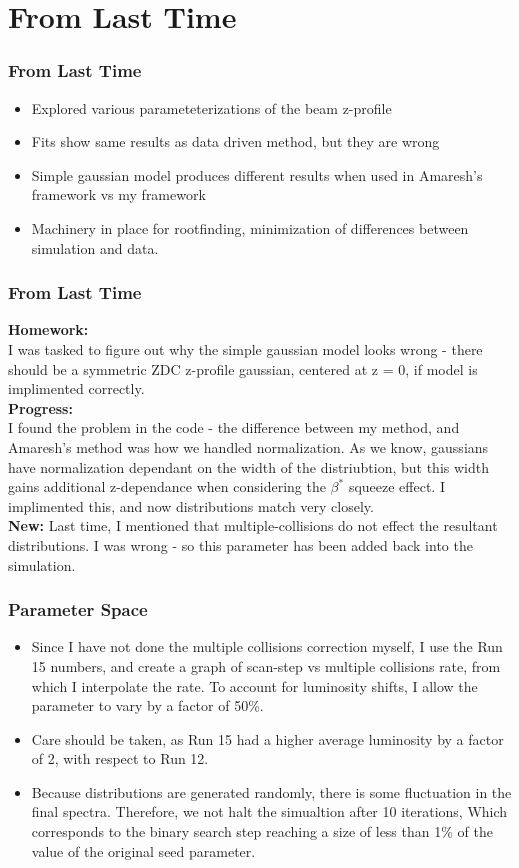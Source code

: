 \section{From Last Time}
\label{Section1_FromLastTime}

\begin{frame}
\frametitle{From Last Time}
\begin{itemize}
	\item Explored various parameteterizations of the beam z-profile
	\item Fits show same results as data driven method, but they are wrong
	\item Simple gaussian model produces different results when used in Amaresh's
		framework vs my framework
	\item Machinery in place for rootfinding, minimization of differences between
		simulation and data.
\end{itemize}
\end{frame}
\begin{frame}
\frametitle{From Last Time}

\textbf{Homework:} \\
I was tasked to figure out why the simple gaussian model looks wrong - there
should be a symmetric ZDC z-profile gaussian, centered at z = 0, if model is
implimented correctly.\\
\textbf{Progress:} \\
I found the problem in the code - the difference between my method, and
Amaresh's method was how we handled normalization. As we know, gaussians have
normalization dependant on the width of the distriubtion, but this width gains
additional z-dependance when considering the $\beta^*$ squeeze effect. I
implimented this, and now distributions match very closely.\\
\textbf{New:}
Last time, I mentioned that multiple-collisions do not effect the resultant
distributions. I was wrong - so this parameter has been added back into the
simulation.
\end{frame}

\begin{frame}
	\frametitle{Parameter Space}
	\begin{itemize}
		\item Since I have not done the multiple collisions correction myself, I
			use the Run 15 numbers, and create a graph of scan-step vs multiple
			collisions rate, from which I interpolate the rate. To account for
			luminosity shifts, I allow the parameter to vary by a factor of 50\%.
		\item Care should be taken, as Run 15 had a higher average luminosity by a
			factor of 2, with respect to Run 12.
		\item Because distributions are generated randomly, there is some
			fluctuation in the final spectra. Therefore, we not halt the simualtion
			after 10 iterations, Which corresponds to the binary search step reaching
			a size of less than 1\% of the value of the original seed parameter.
	\end{itemize}
\end{frame}

